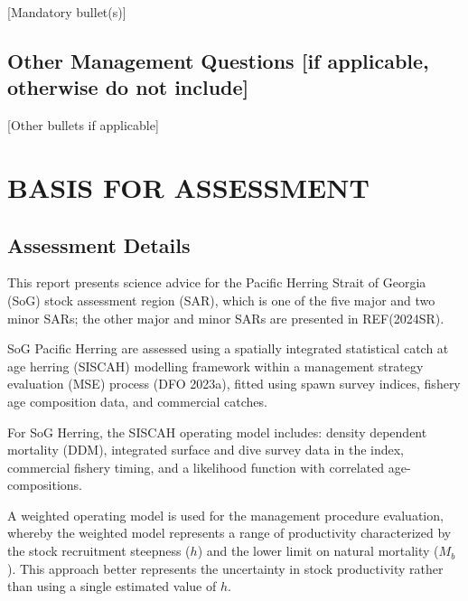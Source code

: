 \documentclass[11pt]{book}
\begin{document}
{[}Mandatory bullet(s){]}

\hypertarget{other-management-questions-if-applicable-otherwise-do-not-include}{%
\subsection*{Other Management Questions {[}if applicable, otherwise do not include{]}}\label{other-management-questions-if-applicable-otherwise-do-not-include}}

{[}Other bullets if applicable{]}

\hypertarget{basis-for-assessment}{%
\section*{BASIS FOR ASSESSMENT}\label{basis-for-assessment}}

\hypertarget{assessment-details}{%
\subsection*{Assessment Details}\label{assessment-details}}

This report presents science advice for the Pacific Herring Strait of Georgia (SoG) stock assessment region (SAR), which is one of the five major and two minor SARs; the other major and minor SARs are presented in REF(2024SR).

SoG Pacific Herring are assessed using a spatially integrated statistical catch at age herring (SISCAH) modelling framework within a management strategy evaluation (MSE) process (DFO 2023a), fitted using spawn survey indices, fishery age composition data, and commercial catches.

For SoG Herring, the SISCAH operating model includes: density dependent mortality (DDM), integrated surface and dive survey data in the index, commercial fishery timing, and a likelihood function with correlated age-compositions.

A weighted operating model is used for the management procedure evaluation, whereby the weighted model represents a range of productivity characterized by the stock recruitment steepness (\(h\)) and the lower limit on natural mortality (\(M_b\)). This approach better represents the uncertainty in stock productivity rather than using a single estimated value of \(h\).
\end{document}

